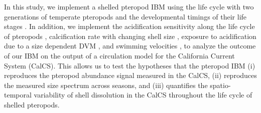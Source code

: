 
In this study, we implement a shelled pteropod IBM using the life cycle with two generations of temperate pteropods \citep{lalli1989pelagic,Dadon1992Reproduction,Wang2017Lifecycle,Maas2020Lipids} and the developmental timings of their life stages \citep{Howes2014Lab,Thabet2015Lifestages}. In addition, we implement the acidification sensitivity along the life cycle of pteropods \citep{Bednarsek2016CumulativeEffects}, calcification rate with changing shell size \citep{Bednarsek2014CalcificationDissolution}, exposure to acidification due to a size dependent DVM \citep{Maas2012DVM,Bednarsek2015VerticalDistribution}, and swimming velocities \citep{Bergan2017SwimmingSinkingSpeeds}, to analyze the outcome of our IBM on the output of a circulation model for the California Current System (CalCS). This allows us to test the hypotheses that the pteropod IBM (i) reproduces the pteropod abundance signal measured in the CalCS, (ii) reproduces the measured size spectrum across seasons, and (iii) quantifies the spatio-temporal variability of shell dissolution in the CalCS throughout the life cycle of shelled pteropods.






